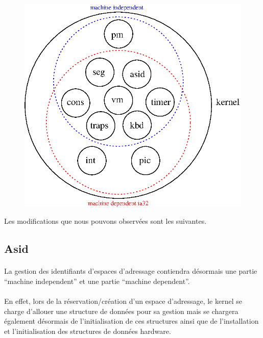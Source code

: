 \documentclass[10pt,a4wide]{article}
\begin{document}
\begin{figure}[h]
\centerline{\includegraphics{figures/visualisation.eps}}
\end{figure}

Les modifications que nous pouvons observ\'ees sont les suivantes.

\subsection{Asid}

\paragraph{}

La gestion des identifiants d'espaces d'adressage contiendra d\'esormais
une partie ``machine independent'' et une partie ``machine dependent''.

\paragraph{}

En effet, lors de la r\'eservation/cr\'eation d'un espace d'adressage,
le kernel se charge d'allouer une structure de donn\'ees pour sa gestion
mais se chargera \'egalement d\'esormais de l'initialisation de ces
structures ainsi que de l'installation et l'initialisation des structures
de donn\'ees hardware.
\end{document}
